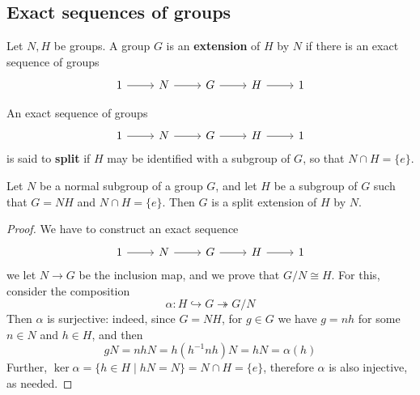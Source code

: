 \subsection{Exact sequences of groups}
\begin{definition}
Let $N,H$ be groups. A group $G$ is an \textbf{extension} of $H$ by $N$ if there is an exact sequence of groups
\[\begin{tikzcd}
1\ar[r]&N\ar[r]&G\ar[r]&H\ar[r]&1
\end{tikzcd}\]
\end{definition}
\begin{definition}
An exact sequence of groups
\[\begin{tikzcd}
1\ar[r]&N\ar[r]&G\ar[r]&H\ar[r]&1
\end{tikzcd}\]
is said to \textbf{split} if $H$ may be identified with a subgroup of $G$, so that $N\cap H=\{e\}$.
\end{definition}
\begin{lemma}
Let $N$ be a normal subgroup of a group $G$, and let $H$ be a subgroup of $G$ such that $G=NH$ and $N\cap H=\{e\}$. Then $G$ is a split extension of $H$ by $N$.
\end{lemma}
\begin{proof}
We have to construct an exact sequence
\[\begin{tikzcd}
1\ar[r]&N\ar[r]&G\ar[r]&H\ar[r]&1
\end{tikzcd}\]
we let $N\to G$ be the inclusion map, and we prove that $G/N\cong H$. For this,
consider the composition
\[\alpha:H\hookrightarrow G\twoheadrightarrow G/N\]
Then $\alpha$ is surjective: indeed, since $G=NH$, for $g\in G$ we have $g=nh$ for some $n\in N$ and $h\in H$, and then
\[gN=nhN=h(h^{-1}nh)N=hN=\alpha(h)\]
Further, $\ker\alpha=\{h\in H\mid hN=N\}=N\cap H=\{e\}$, therefore $\alpha$ is also injective, as needed.
\end{proof}
